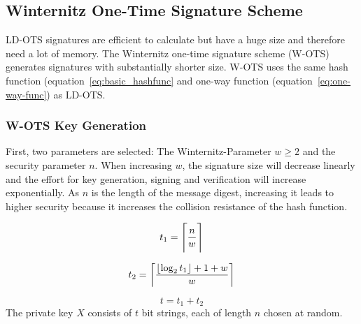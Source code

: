 
\subsection{Winternitz One-Time Signature Scheme}
LD-OTS signatures are efficient to calculate but have a huge size and therefore need a lot of memory. The Winternitz one-time signature scheme (W-OTS) generates signatures with substantially shorter size. W-OTS uses the same hash function (equation~\ref{eq:basic_hashfunc} and one-way function (equation~\ref{eq:one-way-func}) as LD-OTS. %

\subsubsection{W-OTS Key Generation}
First, two parameters are selected: The Winternitz-Parameter $w \geq 2$ and the security parameter $n$. When increasing $w$, the signature size will decrease linearly and the effort for key generation, signing and verification will increase exponentially. As $n$ is the length of the message digest, increasing it leads to higher security because it increases the collision resistance of the hash function. %


\begin{equation}
\label{eq:t1}
t_1 = \ceil[\Bigg]{\frac{n}{w}}
\end{equation}

\begin{equation}
\label{eq:t2}
t_2 = \ceil*{\frac{\floor*{\log_2 t_1} + 1 + w}{w} }
\end{equation}

\begin{equation}
\label{eq:t}
t = t_1 + t_2
\end{equation}
The private key $X$ consists of $t$ bit strings, each of length $n$ chosen at random.

